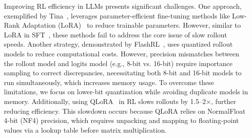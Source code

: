 Improving RL efficiency in LLMs presents significant challenges. One approach, exemplified by Tina~\citep{tina}, leverages parameter-efficient fine-tuning methods like Low-Rank Adaptation (LoRA)~\citep{lora} to reduce trainable parameters. However, similar to LoRA in SFT~\citep{longlora}, these methods fail to address the core issue of slow rollout speeds. Another strategy, demonstrated by FlashRL~\citep{liu2025flashrl}, uses quantized rollout models to reduce computational costs. However, precision mismatches between the rollout model and logits model (e.g., 8-bit vs. 16-bit) require importance sampling to correct discrepancies, necessitating both 8-bit and 16-bit models to run simultaneously, which increases memory usage. To overcome these limitations, we focus on lower-bit quantization while avoiding duplicate models in memory. Additionally, using QLoRA~\citep{qlora} in RL slows rollouts by 1.5–2$\times$, further reducing efficiency. This slowdown occurs because QLoRA relies on NormalFloat 4-bit (NF4) precision, which requires unpacking and mapping to floating-point values via a lookup table before matrix multiplication.

